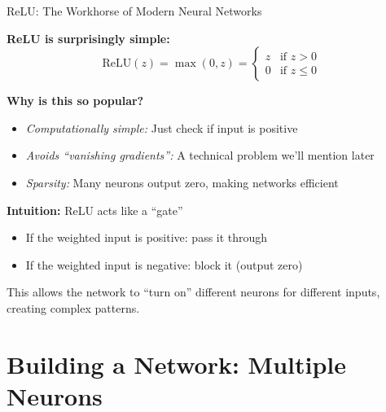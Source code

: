 \documentclass[10pt]{beamer}
\begin{document}

\begin{frame}{ReLU: The Workhorse of Modern Neural Networks}

  \textbf{ReLU is surprisingly simple:}
  \[
  \text{ReLU}(z) = \max(0, z) = \begin{cases} z & \text{if } z > 0 \\ 0 & \text{if } z \leq 0 \end{cases}
  \]

  \vspace{0.5em}
  \textbf{Why is this so popular?}
  \begin{itemize}
    \item \textit{Computationally simple:} Just check if input is positive
    \item \textit{Avoids ``vanishing gradients'':} A technical problem we'll mention later
    \item \textit{Sparsity:} Many neurons output zero, making networks efficient
  \end{itemize}

  \vspace{1em}
  \textbf{Intuition:} ReLU acts like a ``gate''
  \begin{itemize}
    \item If the weighted input is positive: pass it through
    \item If the weighted input is negative: block it (output zero)
  \end{itemize}

  \vspace{0.5em}
  This allows the network to ``turn on'' different neurons for different inputs, creating complex patterns.
\end{frame}

\section{Building a Network: Multiple Neurons}
\end{document}
